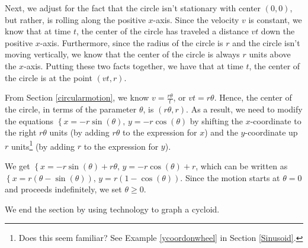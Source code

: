 \documentclass{ximera}
\begin{document}
\smallskip

Next, we  adjust for the fact that the circle isn't stationary with center $(0,0)$, but rather, is rolling along the positive $x$-axis.  Since the velocity $v$ is constant, we know that at time $t$, the center of the circle has traveled a distance $vt$ down the positive $x$-axis.  Furthermore, since the radius of the circle is $r$ and the circle isn't moving vertically, we know that the center of the circle is always $r$ units above the $x$-axis.   Putting these two facts together, we have that at time $t$, the center of the circle is at the point $(vt,r)$. 

\smallskip

From Section \ref{circularmotion}, we know $v = \frac{r \theta}{t}$, or $vt = r\theta$.  Hence, the center of the circle, in terms of the parameter $\theta$, is $(r\theta,r)$. As a result, we need to modify the equations $\left\{ x = -r\sin(\theta), \, y = -r\cos(\theta) \right.$  by shifting the $x$-coordinate to the right $r\theta$ units (by adding $r\theta$ to the expression for $x$) and the $y$-coordinate up $r$ units\footnote{Does this seem familiar?  See Example \ref{ycoordonwheel} in Section \ref{Sinusoid}.} (by adding $r$ to the expression for $y$).  

\smallskip

We get $\left\{ x = -r\sin(\theta)+ r\theta, \, y = -r\cos(\theta) + r \right.$, which can be written as $\left\{ x = r(\theta -\sin(\theta)), \, y = r(1-\cos(\theta)) \right.$. Since the motion starts at $\theta = 0$ and proceeds indefinitely, we set  $\theta \geq 0$.  

\smallskip

We end the section by using technology to graph a cycloid.
\end{document}
